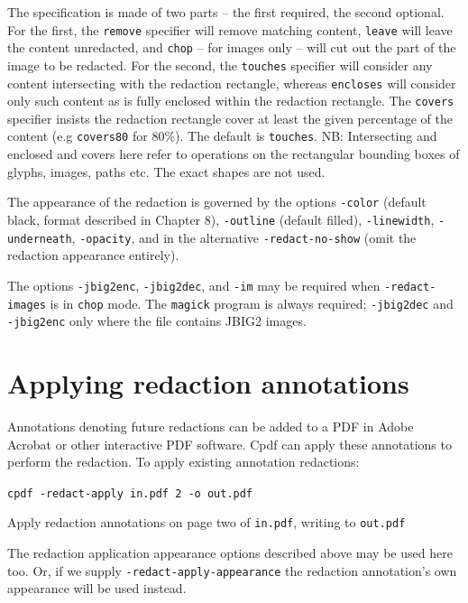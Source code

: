 \documentclass{book}
\begin{document}
\noindent The specification is made of two parts -- the first required, the second optional. For the first, the \texttt{remove} specifier will remove matching content, \texttt{leave} will leave the content unredacted, and \texttt{chop} -- for images only -- will cut out the part of the image to be redacted. For the second, the \texttt{touches} specifier will consider any content intersecting with the redaction rectangle, whereas \texttt{encloses} will consider only such content as is fully enclosed within the redaction rectangle. The \texttt{covers} specifier insists the redaction rectangle cover at least the given percentage of the content (e.g \texttt{covers80} for 80\%). The default is \texttt{touches}. NB: Intersecting and enclosed and covers here refer to operations on the rectangular bounding boxes of glyphs, images, paths etc. The exact shapes are not used.

The appearance of the redaction is governed by the options \texttt{-color} (default black, format described in Chapter 8), \texttt{-outline} (default filled), \texttt{-linewidth}, \texttt{-underneath}, \texttt{-opacity}, and in the alternative \texttt{-redact-no-show} (omit the redaction appearance entirely).

The options \texttt{-jbig2enc}, \texttt{-jbig2dec}, and \texttt{-im} may be required when \texttt{-redact-images} is in \texttt{chop} mode. The \texttt{magick} program is always required; \texttt{-jbig2dec} and \texttt{-jbig2enc} only where the file contains JBIG2 images.

\section{Applying redaction annotations}

Annotations denoting future redactions can be added to a PDF in Adobe Acrobat or other interactive PDF software. Cpdf can apply these annotations to perform the redaction. To apply existing annotation redactions:

  \begin{framed}
    \noindent\small\verb!cpdf -redact-apply in.pdf 2 -o out.pdf!
 
    \vspace{2.5mm}
    \noindent Apply redaction annotations on page two of \texttt{in.pdf}, writing to \texttt{out.pdf}
  \end{framed}

\noindent The redaction application appearance options described above may be used here too. Or, if we supply \texttt{-redact-apply-appearance} the redaction annotation's own appearance will be used instead.
\end{document}
